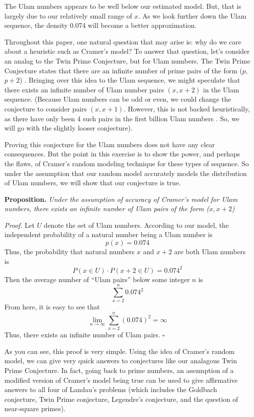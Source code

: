 \documentclass[conference]{IEEEtran}
\begin{document}
The Ulam numbers appears to be well below our estimated model. But, that is largely due to our relatively small range of $x$. As we look further down the Ulam sequence, the density 0.074 will become a better approximation.

Throughout this paper, one natural question that may arise is: why do we care about a heuristic such as Cramer's model? To answer that question, let's consider an analag to the Twin Prime Conjecture, but for Ulam numbers. The Twin Prime Conjecture states that there are an infinite number of prime pairs of the form ($p$, $p + 2$) \cite{b3}. Bringing over this idea to the Ulam sequence, we might speculate that there exists an infinite number of Ulam number pairs $(x, x + 2)$ in the Ulam sequence. (Because Ulam numbers can be odd or even, we could change the conjecture to consider pairs $(x, x + 1)$. However, this is not backed heuristically, as there have only been 4 such pairs in the first billion Ulam numbers \cite{b2}. So, we will go with the slightly looser conjecture). 

Proving this conjecture for the Ulam numbers does not have any clear consequences. But the point in this exercise is to show the power, and perhaps the flaws, of Cramer's random modeling technique for these types of sequence. So under the assumption that our random model accurately models the distribution of Ulam numbers, we will show that our conjecture is true.

\medskip\noindent
\textbf{Proposition.} \textit{Under the assumption of accuracy of Cramer's model for Ulam numbers, there exists an infinite number of Ulam pairs of the form ($x, x + 2$)} 

\smallskip\noindent
\textit{Proof.} Let $U$ denote the set of Ulam numbers. According to our model, the independent probability of a natural number being a Ulam number is
    \[p(x) = 0.074\]
Thus, the probability that natural numbers $x$ and $x + 2$ are both Ulam numbers is
    \[P(x \in U) \cdot P(x + 2 \in U) = 0.074^2\]
Then the average number of ``Ulam pairs'' below some integer $n$ is
\[\sum_{x = 2}^{n}0.074^2\]
From here, it is easy to see that
\[\lim_{n\rightarrow \infty} \sum_{x = 2}^{n}(0.074)^2 = \infty\]
Thus, there exists an infinite number of Ulam pairs.
\hfill$\square$\medskip

As you can see, this proof is very simple. Using the idea of Cramer's random model, we can give very quick answers to conjectures like our analagous Twin Prime Conjecture. In fact, going back to prime numbers, an assumption of a modified version of Cramer's model being true can be used to give affirmative answers to all four of Landau's problems \cite{b1} (which includes the Goldbach conjecture, Twin Prime conjecture, Legendre's conjecture, and the question of near-square primes).
\end{document}
